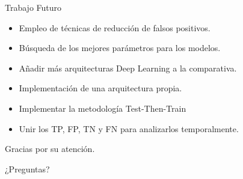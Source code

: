 \documentclass[10pt]{beamer}
\begin{document}
\begin{frame}[fragile]{Trabajo Futuro}
	\vspace{10px}
	\pause
	
	\begin{itemize}
		\item Empleo de técnicas de reducción de falsos positivos.
		\pause
		\item Búsqueda de los mejores parámetros para los modelos.
		\pause
		\item Añadir más arquitecturas Deep Learning a la comparativa.
		\pause
		\item Implementación de una arquitectura propia.
		\pause
		\item Implementar la metodología Test-Then-Train
		\pause
		\item Unir los TP, FP, TN y FN para analizarlos temporalmente.
	\end{itemize}
	
\end{frame}

\begin{frame}[standout]
	\LARGE{Gracias por su atención.}
	
	\vspace{10px}
	
	\LARGE{¿Preguntas?}
	\vspace{10px}
\end{frame}
\end{document}
